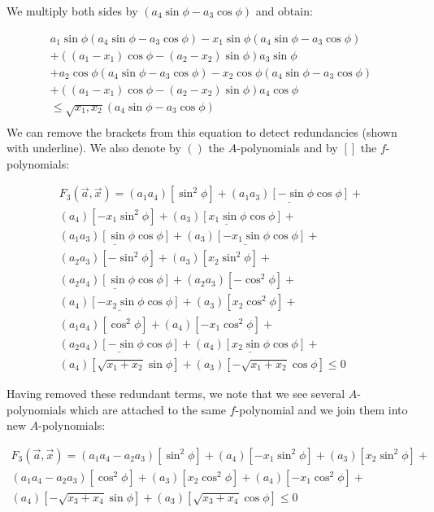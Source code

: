 \documentclass{article}
\begin{document}
We multiply both sides by $(a_4 \sin \phi -a_3 \cos \phi)$ and obtain:


\begin{align*}
    a_1 \sin \phi (a_4 \sin \phi -a_3 \cos \phi) - x_1 \sin \phi (a_4 \sin \phi -a_3 \cos \phi)  \\
    + ((a_1 - x_1)\cos \phi  - (a_2 - x_2)\sin \phi) a_3 \sin \phi \\
    + a_2 \cos \phi (a_4 \sin \phi -a_3 \cos \phi) - x_2 \cos \phi (a_4 \sin \phi -a_3 \cos \phi) \\
    + ((a_1 - x_1)\cos \phi  - (a_2 - x_2)\sin \phi) a_4 \cos \phi \\
    \le  \sqrt{x_1, x_2}(a_4 \sin \phi -a_3 \cos \phi)\\
\end{align*}
We can remove the brackets from this equation to detect redundancies (shown with underline). We also denote by $()$ the $A$-polynomials and by $[]$ the $f$-polynomials:

\begin{align*}
   F_3(\vec{a}, \vec{x}) = (a_1 a_4)[\sin^2 \phi] + \underline{(a_1 a_3)[- \sin \phi \cos \phi]} + \\
    (a_4) [- x_1 \sin^2 \phi] + \underline{(a_3)[x_1 \sin \phi \cos \phi]} + \\
    \underline{(a_1 a_3)[\sin \phi \cos \phi]} + \underline{(a_3)[-x_1 \sin \phi \cos \phi]} + \\
    (a_2 a_3)[-\sin^2 \phi] + (a_3)[x_2 \sin^2 \phi] + \\
    \underline{(a_2 a_4)[\sin \phi \cos \phi]} + (a_2 a_3)[-\cos^2 \phi] + \\
    \underline{(a_4)[-x_2 \sin \phi \cos \phi]} + (a_3)[x_2 \cos^2 \phi] + \\
    (a_1 a_4)[\cos^2 \phi] + (a_4)[-x_1 \cos^2 \phi] + \\
    \underline{(a_2 a_4)[-\sin \phi \cos \phi]} + \underline{(a_4)[x_2 \sin \phi \cos \phi]} + \\
    (a_4)[\sqrt{x_1 + x_2}\sin \phi] + (a_3)[-\sqrt{x_1 + x_2}\cos \phi] \le 0
\end{align*}

Having removed these redundant terms, we note that we see several $A$-polynomials which are attached to the same $f$-polynomial and we join them into new $A$-polynomials:

\begin{align*}
    F_3(\vec{a}, \vec{x}) = (a_1 a_4 - a_2 a_3)[\sin^2 \phi] +     (a_4) [- x_1 \sin^2 \phi] +    (a_3)[x_2 \sin^2 \phi] + \\
   (a_1 a_4 - a_2a_3)[\cos^2 \phi] + (a_3)[x_2\cos^2 \phi] + (a_4)[-x_1 \cos^2 \phi] + \\
    (a_4)[-\sqrt{x_3 + x_4}\sin \phi] + (a_3)[\sqrt{x_3 + x_4}\cos \phi] \le 0
\end{align*}
\end{document}
